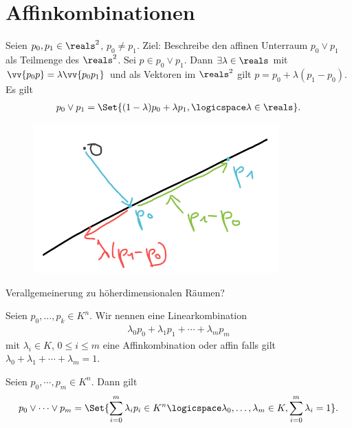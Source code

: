 \section{Affinkombinationen}
\begin{beispiel*}
    Seien \( p_0,p_1\in \reals^2 \), \( p_0\neq p_1 \). Ziel: Beschreibe den affinen Unterraum \( p_0\vee p_1 \) als Teilmenge des \( \reals^2 \). Sei \( p\in p_0\vee p_1 \). Dann \( \exists \lambda\in \reals \) mit \( \vv{p_0 p}=\lambda \vv{p_0 p_1} \) und als Vektoren im \( \reals^2 \) gilt \( p=p_0+\lambda(p_1-p_0) \). Es gilt
    \begin{align*}
        p_0 \vee p_1=\Set{(1-\lambda)p_0+\lambda p_1,\logicspace \lambda\in \reals}.
    \end{align*}
    \begin{figure}[H]
        \centering
        \includegraphics[width=0.5\linewidth]{figures/affine_verbindungsgerade}
        \label{fig:affine_verbindungsgerade}
    \end{figure}
    
\end{beispiel*}
\begin{frage*}
    Verallgemeinerung zu höherdimensionalen Räumen?
\end{frage*}
\begin{definition*}
    Seien \( p_0,\dotsc,p_k\in  K^n \). Wir nennen eine Linearkombination
    \begin{align*}
        \lambda_0 p_0+\lambda_1 p_1+\dotsb+\lambda_m p_m
    \end{align*}
    mit \( \lambda_i\in K \), \( 0\leq i\leq m \) eine Affinkombination oder affin falls gilt \( \lambda_0+\lambda_1+\dotsb+\lambda_m=1 \).
\end{definition*}
\begin{satz}
    Seien \( p_0,\dotsb,p_m\in K^n \). Dann gilt
    \begin{align*}
        p_0\vee \dotsb \vee p_m =\Set{\sum_{i=0}^{m}\lambda_i p_i\in K^n \logicspace \lambda_0,\dotsc,\lambda_m\in K, \sum_{i=0}^{m}\lambda_i=1}.
    \end{align*}
\end{satz}
